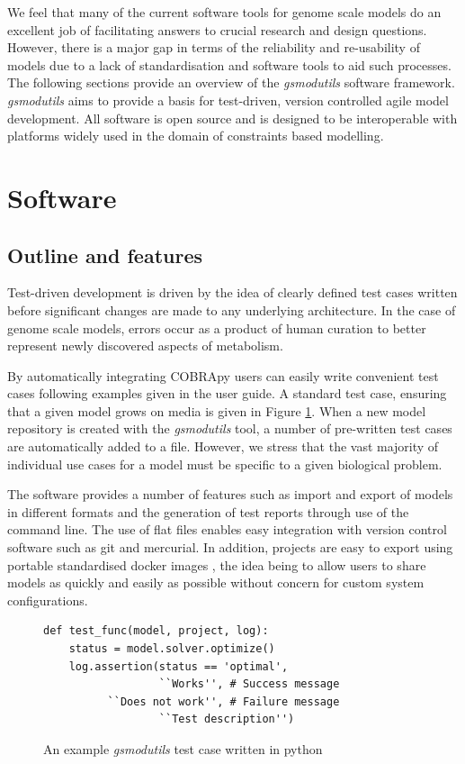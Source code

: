\documentclass[journal=asbcd6,10pt]{achemso}
\begin{document}
We feel that many of the current software tools for genome scale models do an excellent job of facilitating answers to crucial research and design questions.
However, there is a major gap in terms of the reliability and re-usability of models due to a lack of standardisation and software tools to aid such processes.
The following sections provide an overview of the \textit{gsmodutils} software framework.
\textit{gsmodutils} aims to provide a basis for test-driven, version controlled agile model development.
All software is open source and is designed to be interoperable with platforms widely used in the domain of constraints based modelling.

\section{Software}

\subsection{Outline and features}
Test-driven development is driven by the idea of clearly defined test cases written before significant changes are made to any underlying architecture.
In the case of genome scale models, errors occur as a product of human curation to better represent newly discovered aspects of metabolism.

By automatically integrating COBRApy \cite{ebrahim2013cobrapy} users can easily write convenient test cases following examples given in the user guide.
A standard test case, ensuring that a given model grows on media is given in Figure \ref{fig:test_case}.
When a new model repository is created with the \textit{gsmodutils} tool, a number of pre-written test cases are automatically added to a file.
However, we stress that the vast majority of individual use cases for a model must be specific to a given biological problem.

The software provides a number of features such as import and export of models in different formats and the generation of test reports through use of the command line. 
The use of flat files enables easy integration with version control software such as git and mercurial.
In addition, projects are easy to export using portable standardised docker images \cite{merkel2014docker}, the idea being to allow users to share models as quickly and easily as possible without concern for custom system configurations.

\begin{figure}[ht]

\lstset{language=python}   
\begin{lstlisting}
def test_func(model, project, log):
    status = model.solver.optimize()
    log.assertion(status == 'optimal',
                  ``Works'', # Success message
		  ``Does not work'', # Failure message
                  ``Test description'')
\end{lstlisting}
\caption{An example \textit{gsmodutils} test case written in python}
\label{fig:test_case} 
\end{figure}
\end{document}
